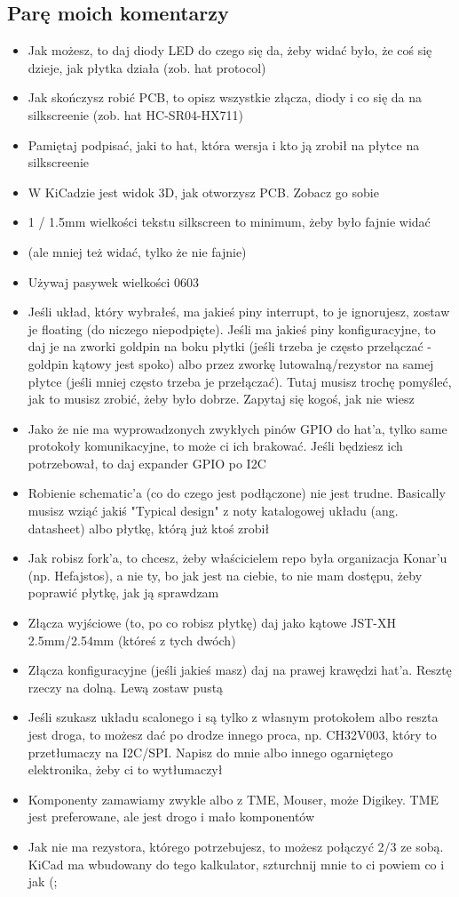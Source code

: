\documentclass[b5paper, 10pt, twoside]{book}
\begin{document}
\subsection{Parę moich komentarzy}
\begin{itemize}
  \item Jak możesz, to daj diody LED do czego się da, żeby widać było, że coś się dzieje, jak płytka działa (zob. hat protocol)
  \item Jak skończysz robić PCB, to opisz wszystkie złącza, diody i co się da na silkscreenie (zob. hat HC-SR04-HX711)
  \item Pamiętaj podpisać, jaki to hat, która wersja i kto ją zrobił na płytce na silkscreenie
  \item W KiCadzie jest widok 3D, jak otworzysz PCB. Zobacz go sobie
  \item 1 / 1.5mm wielkości tekstu silkscreen to minimum, żeby było fajnie widać
  \item (ale mniej też widać, tylko że nie fajnie)
  \item Używaj pasywek wielkości 0603
  \item Jeśli układ, który wybrałeś, ma jakieś piny interrupt, to je ignorujesz,
        zostaw je floating (do niczego niepodpięte). Jeśli ma jakieś piny konfiguracyjne, to daj je na zworki goldpin na boku płytki (jeśli trzeba je często przełączać - goldpin kątowy jest spoko) albo przez zworkę lutowalną/rezystor na samej płytce (jeśli mniej często trzeba je przełączać). Tutaj musisz trochę pomyśleć, jak to musisz zrobić, żeby było dobrze. Zapytaj się kogoś, jak nie wiesz
  \item Jako że nie ma wyprowadzonych zwykłych pinów GPIO do hat'a, tylko same protokoły komunikacyjne, to może ci ich brakować. Jeśli będziesz ich potrzebował, to daj expander GPIO po I2C
  \item Robienie schematic'a (co do czego jest podłączone) nie jest trudne. Basically musisz wziąć jakiś "Typical design" z noty katalogowej układu (ang. datasheet) albo płytkę, którą już ktoś zrobił
  \item Jak robisz fork'a, to chcesz, żeby właścicielem repo była organizacja Konar'u (np. Hefajstos), a nie ty, bo jak jest na ciebie, to nie mam dostępu, żeby poprawić płytkę, jak ją sprawdzam
  \item Złącza wyjściowe (to, po co robisz płytkę) daj jako kątowe JST-XH 2.5mm/2.54mm (któreś z tych dwóch)
  \item Złącza konfiguracyjne (jeśli jakieś masz) daj na prawej krawędzi hat'a. Resztę rzeczy na dolną. Lewą zostaw pustą
  \item Jeśli szukasz układu scalonego i są tylko z własnym protokołem albo reszta jest droga, to możesz dać po drodze innego proca, np. CH32V003, który to przetłumaczy na I2C/SPI. Napisz do mnie albo innego ogarniętego elektronika, żeby ci to wytłumaczył
  \item Komponenty zamawiamy zwykle albo z TME, Mouser, może Digikey. TME jest preferowane, ale jest drogo i mało komponentów
  \item Jak nie ma rezystora, którego potrzebujesz, to możesz połączyć 2/3 ze sobą. KiCad ma wbudowany do tego kalkulator, szturchnij mnie to ci powiem co i jak (;


\end{itemize}
\end{document}
